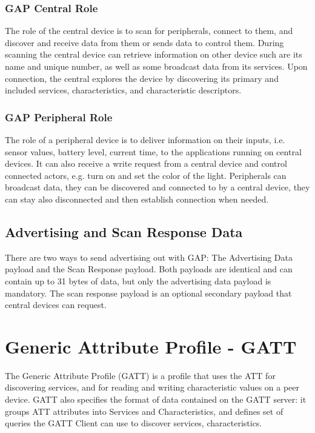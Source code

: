 \documentclass[a4paper,titlepage,oneside,12pt]{amsart} %
\begin{document}
\subsubsection{GAP Central Role} The role of the central device is to scan for peripherals, connect to them, and discover and receive data from them or sends data to control them. During scanning the central device can retrieve information on other device such are its name and unique number, as well as some broadcast data from its services. Upon connection, the central explores the device by discovering its primary and included services, characteristics, and characteristic descriptors.

\subsubsection{GAP Peripheral Role} The role of a peripheral device is to deliver information on their inputs, i.e. sensor values, battery level, current time, to the applications running on central devices. It can also receive a write request from a central device and control connected actors, e.g. turn on and set the color of the light.
Peripherals can broadcast data, they can be discovered and connected to by a central device, they can stay also disconnected and then establish connection when needed. 

\subsection{Advertising and Scan Response Data}
There are two ways to send advertising out with GAP: The Advertising Data payload and the Scan Response payload. Both payloads are identical and can contain up to 31 bytes of data, but only the advertising data payload is mandatory. The scan response payload is an optional secondary payload that central devices can request.


\section{Generic Attribute Profile - GATT}
The Generic Attribute Profile (GATT) is a profile that uses the ATT for discovering services, and for reading and writing characteristic values on a peer device. GATT also specifies the format of data contained on the GATT server: it groups ATT attributes into Services and Characteristics, and defines set of queries the GATT Client can use to discover services, characteristics.
\end{document}
